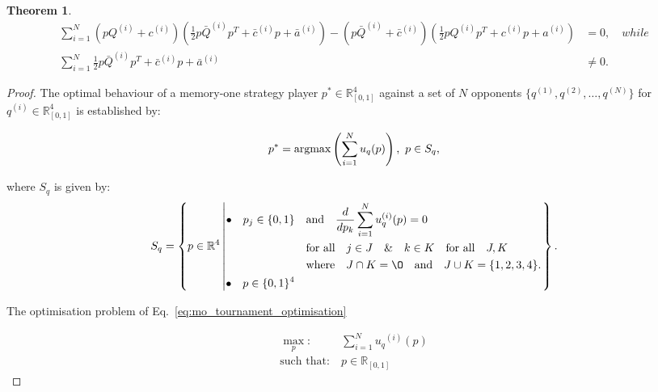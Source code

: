 \documentclass[10pt]{article}
\newcommand{\R}{\mathbb{R}}
\newtheorem{theorem}{Theorem}
\begin{document}
\begin{theorem}
{\scriptsize
\begin{align}\label{eq:polynomials_roots}
    \displaystyle\sum\limits_{i=1} ^ {N}
    \left(pQ^{(i)} + c^{(i)}\right) \left(\frac{1}{2} p\bar{Q}^{(i)} p^T + \bar{c}^{(i)} p + \bar{a}^ {(i)}\right)
    - \left(p\bar{Q}^{(i)} + \bar{c}^{(i)}\right) \left(\frac{1}{2} pQ^{(i)} p^T + c^{(i)} p + a^ {(i)}\right)
    & = 0, \quad {while} \\
    \displaystyle\sum\limits_{i=1} ^ {N} \frac{1}{2} p\bar{Q}^{(i)} p^T + \bar{c}^{(i)} p + \bar{a}^ {(i)} & \neq 0.
\end{align}}

\end{theorem}

\begin{proof}
    The optimal behaviour of a memory-one strategy player
    \(p^* \in \R_{[0, 1]} ^ 4\)
    against a set of \(N\) opponents \(\{q^{(1)}, q^{(2)}, \dots, q^{(N)} \}\)
    for \(q^{(i)} \in \R_{[0, 1]} ^ 4\) is established by:
    
    \[p^* = \textnormal{argmax}\left(\sum\limits_{i=1} ^ N  u_q(p)\right), \ p \in S_q,\]
    
    where \(S_q\) is given by:
    {\scriptsize
    \begin{equation}\label{eq:s_q_set}
        S_q =
        \left\{p \in \mathbb{R} ^ 4 \left|
            \begin{aligned}
                \bullet\quad p_j \in \{0, 1\} & \quad \text{and} \quad \frac{d}{dp_k} 
                \sum\limits_{i=1} ^ N  u_q^{(i)}(p) = 0 \\
                & \quad \text{for all} \quad j \in J \quad \&  \quad k \in K  \quad \text{for all} \quad J, K \\
                & \quad \text{where} \quad J \cap K = \O \quad
                \text{and} \quad J \cup K = \{1, 2, 3, 4\}.\\
                \bullet\quad  p \in \{0, 1\} ^ 4
            \end{aligned}\right.
        \right\}.
    \end{equation}}

    The optimisation problem of Eq.~\ref{eq:mo_tournament_optimisation} 

    \begin{equation}\label{eq:mo_tournament_optimisation}
        \begin{aligned}
        \max_p: & \ \sum_{i=1} ^ {N} {u_q}^{(i)} (p)
        \\
        \text{such that}: & \ p \in \R_{[0, 1]}
        \end{aligned}
    \end{equation}


\end{proof}
\end{document}
